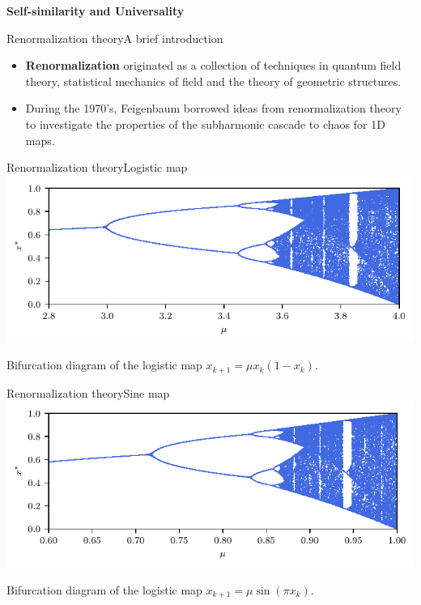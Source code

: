 \documentclass[usenames,dvipsnames,svgnames,10pt,aspectratio=169]{beamer}
\begin{document}
\begin{frame}[t, c]{}
	\centering
	\vspace{1cm}

	{\Large \textbf{Self-similarity and Universality}}

	\bigskip

	{}

\end{frame}

\begin{frame}[t, c]{Renormalization theory}{A brief introduction}
	\begin{itemize}
		\item \alert{\textbf{Renormalization}} originated as a collection of techniques in quantum field theory, statistical mechanics of field and the theory of geometric structures.

		\bigskip

		\item During the 1970's, Feigenbaum borrowed ideas from renormalization theory to investigate the properties of the subharmonic cascade to chaos for 1D maps.
	\end{itemize}

	\vspace{1cm}
\end{frame}

\begin{frame}[t, c]{Renormalization theory}{Logistic map}
	\centering
	\includegraphics[width=.75\textwidth]{logistic_map_bifurcation_zoom_1}

	Bifurcation diagram of the logistic map $x_{k+1} = \mu x_k ( 1 - x_k)$.
	\vspace{1cm}
\end{frame}

\begin{frame}[t, c]{Renormalization theory}{Sine map}
	\centering
	\includegraphics[width=.75\textwidth]{sine_map_bifurcation_diagram}

	Bifurcation diagram of the logistic map $x_{k+1} = \mu \sin \left( \pi x_k \right)$.
	\vspace{1cm}
\end{frame}
\end{document}
